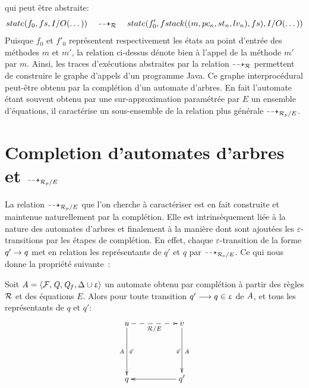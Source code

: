 \noindent qui peut être abstraite:
\[ state(f_0, fs, I/O(\dots)) \quad \dashrightarrow_\mathcal R \quad state(f'_0, fstack((m, pc_n, st_n, lv_n), fs), I/O(\dots)) \]
Puisque $f_0$ et $f'_0$ représentent respectivement les états au point d'entrée des méthodes $m$ et $m'$, la relation ci-dessus
dénote bien à l'appel de la méthode $m'$ par $m$. Ainsi, les traces d'exécutions abstraites par la relation $\dashrightarrow_\mathcal R$
permettent de construire le graphe d'appels d'un programme Java.
Ce graphe interprocédural peut-être obtenu par la complétion d'un automate d'arbres.
En fait l'automate étant souvent obtenu par une sur-approximation paramétrée par $E$ un ensemble d'équations, il caractérise 
un sous-ensemble de la relation plus générale $\dashrightarrow_{\mathcal R_p/E}$. 

\section{Completion d'automates d'arbres et $\dashrightarrow_{\mathcal R_p/E}$}

La relation $\dashrightarrow_{\mathcal R_p/E}$ que l'on cherche à caractériser est en fait construite
et maintenue naturellement par la complétion. Elle est intrinsèquement liée à la nature
des automates d'arbres et finalement à la manière dont sont ajoutées les  $\varepsilon$-transitions 
par les étapes de complétion. En effet, chaque $\varepsilon$-transition de la forme $q' \rightarrow q$
met en relation les représentants de $q'$ et $q$ par $\dashrightarrow_{\mathcal R_\epsilon/E}$.
Ce qui nous donne la propriété suivante~:

\begin{lemma}
  \label{lem:completion_arw}
  Soit $\mathit A = \langle \mathcal{F}, \mathit Q, \mathit Q_f, \Delta \cup \upvarepsilon\rangle$ un automate obtenu 
  par complétion à partir des règles $\mathcal R$ et des équations $E$.
  Alors pour toute transition $q' \longrightarrow q \in \upvarepsilon$ de $\mathit A$,
  et tous les représentants de $q$ et $q'$:
  \[
  \xymatrix{
    u \ar[dd]_{\A}^{\not\varepsilon} \ar@{-->} [rr]_{\R/E} && v \ar[dd]^{\A}_{\not\varepsilon}\\
    &&\\
    q && q' \ar[ll]
  }
  \]
  
  \end{lemma}

